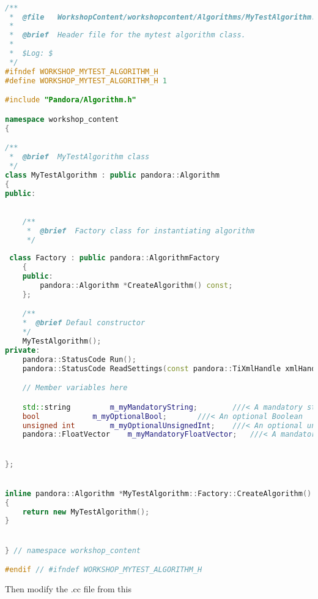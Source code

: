 \begin{lstlisting}[language=C++, caption=Python example]

/**
 *  @file   WorkshopContent/workshopcontent/Algorithms/MyTestAlgorithm.h
 * 
 *  @brief  Header file for the mytest algorithm class.
 * 
 *  $Log: $
 */
#ifndef WORKSHOP_MYTEST_ALGORITHM_H
#define WORKSHOP_MYTEST_ALGORITHM_H 1

#include "Pandora/Algorithm.h"

namespace workshop_content
{

/**
 *  @brief  MyTestAlgorithm class
 */
class MyTestAlgorithm : public pandora::Algorithm
{
public:

	
    /**
     *  @brief  Factory class for instantiating algorithm
     */
  
 class Factory : public pandora::AlgorithmFactory
    {
    public:
        pandora::Algorithm *CreateAlgorithm() const;
    };

	/**
	*  @brief Defaul constructor
	*/
	MyTestAlgorithm();
private:
    pandora::StatusCode Run();
    pandora::StatusCode ReadSettings(const pandora::TiXmlHandle xmlHandle);

    // Member variables here

    std::string			m_myMandatoryString;		///< A mandatory string
    bool 			m_myOptionalBool;		///< An optional Boolean
    unsigned int		m_myOptionalUnsignedInt;	///< An optional unsigned int
    pandora::FloatVector	m_myMandatoryFloatVector;	///< A mandatory vector of floats


};


inline pandora::Algorithm *MyTestAlgorithm::Factory::CreateAlgorithm() const
{
    return new MyTestAlgorithm();
}


} // namespace workshop_content

#endif // #ifndef WORKSHOP_MYTEST_ALGORITHM_H

\end{lstlisting}

Then modify the .cc file from this

